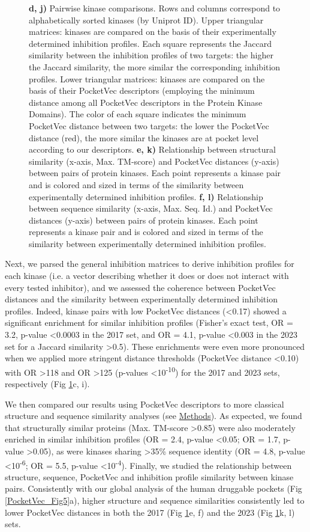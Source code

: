 \begin{figure}[H]
{    \textbf{d, j)} Pairwise kinase comparisons. Rows and columns correspond to alphabetically sorted kinases (by Uniprot ID). Upper triangular matrices: kinases are compared on the basis of their experimentally determined inhibition profiles. Each square represents the Jaccard similarity between the inhibition profiles of two targets: the higher the Jaccard similarity, the more similar the corresponding inhibition profiles. Lower triangular matrices: kinases are compared on the basis of their PocketVec descriptors (employing the minimum distance among all PocketVec descriptors in the Protein Kinase Domains). The color of each square indicates the minimum PocketVec distance between two targets: the lower the PocketVec distance (red), the more similar the kinases are at pocket level according to our descriptors.
    \textbf{e, k)} Relationship between structural similarity (x-axis, Max. TM-score) and PocketVec distances (y-axis) between pairs of protein kinases. Each point represents a kinase pair and is colored and sized in terms of the similarity between experimentally determined inhibition profiles.
    \textbf{f, l)} Relationship between sequence similarity (x-axis, Max. Seq. Id.) and PocketVec distances (y-axis) between pairs of protein kinases. Each point represents a kinase pair and is colored and sized in terms of the similarity between experimentally determined inhibition profiles.
  }
  \label{PocketVec_Fig7}
\end{figure}

Next, we parsed the general inhibition matrices to derive inhibition profiles for each kinase (i.e. a vector describing whether it does or does not interact with every tested inhibitor), and we assessed the coherence between PocketVec distances and the similarity between experimentally determined inhibition profiles. Indeed, kinase pairs with low PocketVec distances (<0.17) showed a significant enrichment for similar inhibition profiles (Fisher’s exact test, OR = 3.2, p-value <0.0003 in the 2017 set, and OR = 4.1, p-value <0.003 in the 2023 set for a Jaccard similarity >0.5). These enrichments were even more pronounced when we applied more stringent distance thresholds (PocketVec distance <0.10) with OR >118 and OR >125 (p-values <10\textsuperscript{-10}) for the 2017 and 2023 sets, respectively (Fig \ref{PocketVec_Fig7}c, i).

We then compared our results using PocketVec descriptors to more classical structure and sequence similarity analyses (see \hyperref[PocketVec_Methods]{Methods}). As expected, we found that structurally similar proteins (Max. TM-score >0.85) were also moderately enriched in similar inhibition profiles (OR = 2.4, p-value <0.05; OR = 1.7, p-value >0.05), as were kinases sharing >35\% sequence identity (OR = 4.8, p-value <10\textsuperscript{-6}; OR = 5.5, p-value <10\textsuperscript{-4}). Finally, we studied the relationship between structure, sequence, PocketVec and inhibition profile similarity between kinase pairs. Consistently with our global analysis of the human druggable pockets (Fig \ref{PocketVec_Fig5}a), higher structure and sequence similarities consistently led to lower PocketVec distances in both the 2017 (Fig \ref{PocketVec_Fig7}e, f) and the 2023 (Fig \ref{PocketVec_Fig7}k, l) sets.

